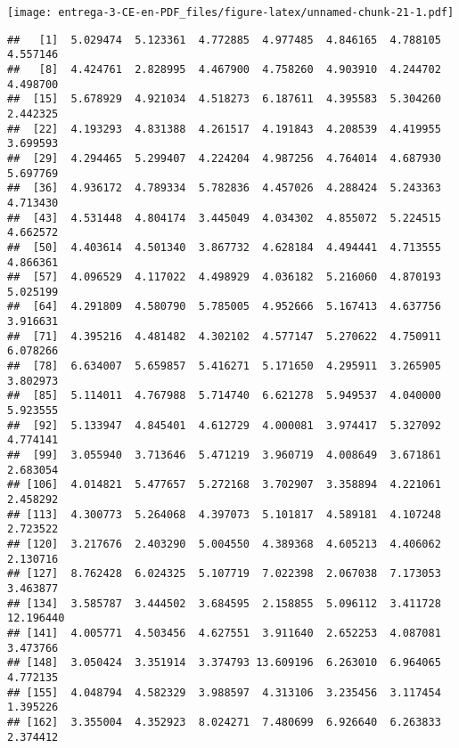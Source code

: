 \documentclass[
]{article}
\newenvironment{Shaded}{\begin{snugshade}}{\end{snugshade}}
\newcommand{\DataTypeTok}[1]{\textcolor[rgb]{0.13,0.29,0.53}{#1}}
\newcommand{\DecValTok}[1]{\textcolor[rgb]{0.00,0.00,0.81}{#1}}
\newcommand{\KeywordTok}[1]{\textcolor[rgb]{0.13,0.29,0.53}{\textbf{#1}}}
\newcommand{\NormalTok}[1]{#1}
\newcommand{\OperatorTok}[1]{\textcolor[rgb]{0.81,0.36,0.00}{\textbf{#1}}}
\newcommand{\StringTok}[1]{\textcolor[rgb]{0.31,0.60,0.02}{#1}}
\begin{document}
\texttt{[image: entrega-3-CE-en-PDF\_files/figure-latex/unnamed-chunk-21-1.pdf]}

\begin{Shaded}
\end{Shaded}

\begin{verbatim}
##   [1]  5.029474  5.123361  4.772885  4.977485  4.846165  4.788105  4.557146
##   [8]  4.424761  2.828995  4.467900  4.758260  4.903910  4.244702  4.498700
##  [15]  5.678929  4.921034  4.518273  6.187611  4.395583  5.304260  2.442325
##  [22]  4.193293  4.831388  4.261517  4.191843  4.208539  4.419955  3.699593
##  [29]  4.294465  5.299407  4.224204  4.987256  4.764014  4.687930  5.697769
##  [36]  4.936172  4.789334  5.782836  4.457026  4.288424  5.243363  4.713430
##  [43]  4.531448  4.804174  3.445049  4.034302  4.855072  5.224515  4.662572
##  [50]  4.403614  4.501340  3.867732  4.628184  4.494441  4.713555  4.866361
##  [57]  4.096529  4.117022  4.498929  4.036182  5.216060  4.870193  5.025199
##  [64]  4.291809  4.580790  5.785005  4.952666  5.167413  4.637756  3.916631
##  [71]  4.395216  4.481482  4.302102  4.577147  5.270622  4.750911  6.078266
##  [78]  6.634007  5.659857  5.416271  5.171650  4.295911  3.265905  3.802973
##  [85]  5.114011  4.767988  5.714740  6.621278  5.949537  4.040000  5.923555
##  [92]  5.133947  4.845401  4.612729  4.000081  3.974417  5.327092  4.774141
##  [99]  3.055940  3.713646  5.471219  3.960719  4.008649  3.671861  2.683054
## [106]  4.014821  5.477657  5.272168  3.702907  3.358894  4.221061  2.458292
## [113]  4.300773  5.264068  4.397073  5.101817  4.589181  4.107248  2.723522
## [120]  3.217676  2.403290  5.004550  4.389368  4.605213  4.406062  2.130716
## [127]  8.762428  6.024325  5.107719  7.022398  2.067038  7.173053  3.463877
## [134]  3.585787  3.444502  3.684595  2.158855  5.096112  3.411728 12.196440
## [141]  4.005771  4.503456  4.627551  3.911640  2.652253  4.087081  3.473766
## [148]  3.050424  3.351914  3.374793 13.609196  6.263010  6.964065  4.772135
## [155]  4.048794  4.582329  3.988597  4.313106  3.235456  3.117454  1.395226
## [162]  3.355004  4.352923  8.024271  7.480699  6.926640  6.263833  2.374412

\end{verbatim}
\end{document}
